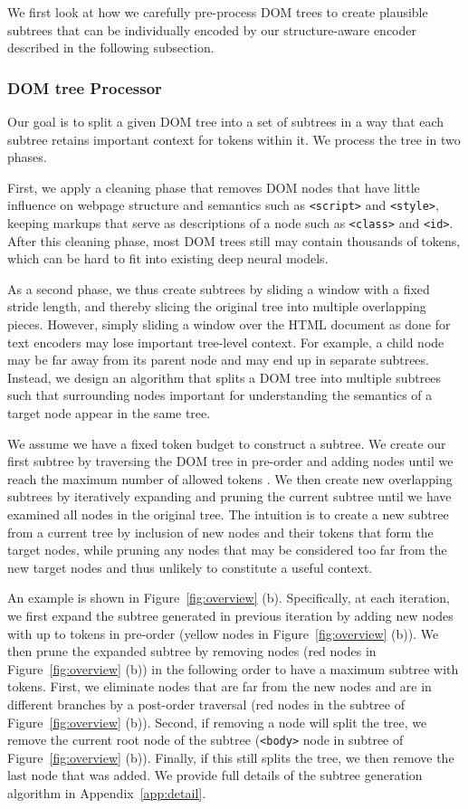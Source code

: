 \documentclass[sigconf, nonacm]{acmart}
\newcommand*\circled[1]{\tikz[baseline=(char.base)]{
            \node[shape=circle,draw,inner sep=1pt] (char) {#1};}}
\newcommand{\nop}[1]{}
\begin{document}
We first look at how we carefully pre-process DOM trees to create plausible subtrees that can be individually encoded by our structure-aware encoder described in the following subsection.
\subsubsection{DOM tree Processor}

Our goal is to split a given DOM tree into a set of subtrees in a way that each subtree retains important context for tokens within it. We process the tree in two phases. 

First, we apply a cleaning phase that removes DOM nodes that have little influence on webpage structure and semantics such as \texttt{<script>} and \texttt{<style>}, keeping markups that serve as descriptions of a node such as \texttt{<class>} and \texttt{<id>}. After this cleaning phase, most DOM trees still may contain thousands of tokens, which can be hard to fit into existing deep neural models. 

As a second phase, we thus create subtrees by sliding a window with a fixed stride length, and thereby slicing the original tree into multiple overlapping pieces. However, simply sliding a window over the HTML document as done for text encoders may lose important tree-level context. For example, a child node may be far away from its parent node and may end up in separate subtrees. Instead, we design an algorithm that splits a DOM tree into multiple subtrees such that surrounding nodes important for understanding the semantics of a target node appear in the same tree.

We assume we have a fixed token budget  to construct a subtree. We create our first subtree by traversing the DOM tree in pre-order and adding nodes\nop{with a stride length of } until we reach the maximum number of allowed tokens . We then create new overlapping subtrees by iteratively expanding and pruning the current subtree until we have examined all nodes in the original tree. The intuition is to create a new subtree from a current tree by inclusion of new nodes and their tokens that form the target nodes, while pruning any nodes that may be considered too far from the new target nodes and thus unlikely to constitute a useful context.

An example is shown in Figure~\ref{fig:overview} (b). Specifically, at each iteration, we first expand the subtree generated in previous iteration by adding new nodes with up to  tokens in pre-order (yellow nodes in Figure~\ref{fig:overview} (b)). We then prune the expanded subtree by removing nodes (red nodes in Figure~\ref{fig:overview} (b)) in the following order to have a maximum subtree with  tokens. First, we eliminate nodes that are far from the new nodes and are in different branches by a post-order traversal  (red nodes in the subtree \circled{2} of Figure~\ref{fig:overview} (b)). Second, if removing a node will split the tree, we remove the current root node of the subtree (\texttt{<body>} node in subtree \circled{3} of Figure~\ref{fig:overview} (b)). Finally, if this still splits the tree, we then remove the last node that was added. We provide full details of the subtree generation algorithm in Appendix~\ref{app:detail}. 
\end{document}
